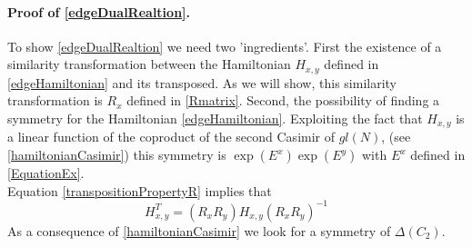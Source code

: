 \documentclass[11pt]{article}
\numberwithin{equation}{section}
\numberwithin{equation}{subsection}
\begin{document}
\paragraph{Proof of \eqref{edgeDualRealtion}.}To show \eqref{edgeDualRealtion} we need two 'ingredients'. First the existence of a similarity transformation between the Hamiltonian $H_{x,y}$ defined in \eqref{edgeHamiltonian} and its transposed. As we will show, this similarity transformation is $R_{x}$ defined in \eqref{Rmatrix}. Second, the possibility of finding a symmetry for the Hamiltonian \eqref{edgeHamiltonian}. Exploiting the fact that $H_{x,y}$ is a linear function of the coproduct of the second Casimir of $gl(N)$, (see \eqref{hamiltonianCasimir}) this symmetry is $\exp{(E^{x})}\exp{(E^{y})}$ with $E^{x}$ defined in \eqref{EquationEx}. \\
Equation \eqref{transpositionPropertyR} implies that 
\begin{equation}\label{transpositionPropertyH}
    H_{x,y}^{T}=\left(R_{x}R_{y}\right)H_{x,y}\left(R_{x}R_{y}\right)^{-1}
\end{equation}
As a consequence of \eqref{hamiltonianCasimir} we look for a symmetry of  $\Delta(C_{2})$. 
\end{document}
